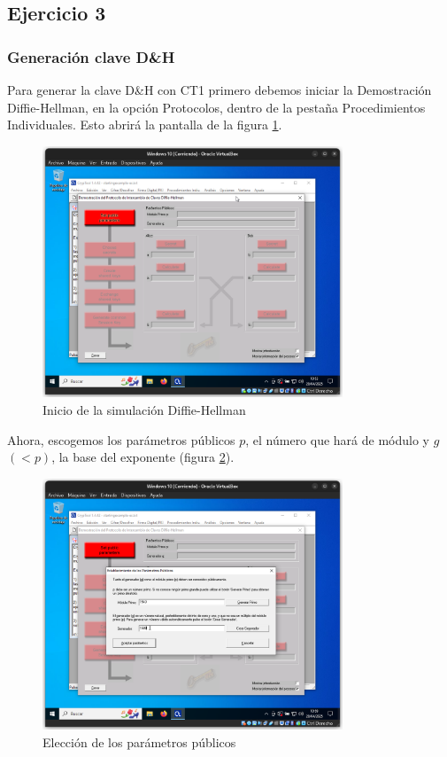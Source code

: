 \subsection{Ejercicio 3}
\graphicspath{ {img/03} }

\subsubsection{Generación clave D\&H}

Para generar la clave D\&H con CT1 primero debemos iniciar la Demostración Diffie-Hellman, en la opción Protocolos, dentro de la pestaña Procedimientos Individuales.
Esto abrirá la pantalla de la figura \ref{fig:inicioD&H}.

\begin{figure}[H]
    \centering
    \includegraphics[width=0.8\textwidth]{D&H-1.png}
    \caption{Inicio de la simulación Diffie-Hellman}
    \label{fig:inicioD&H}
\end{figure}

Ahora, escogemos los parámetros públicos $p$, el número que hará de módulo y $g$ $(<p)$, la base del exponente (figura \ref{fig:publicparams}).

\begin{figure}[H]
    \centering
    \includegraphics[width=0.8\textwidth]{D&H-2.png}
    \caption{Elección de los parámetros públicos}
    \label{fig:publicparams}
\end{figure}

